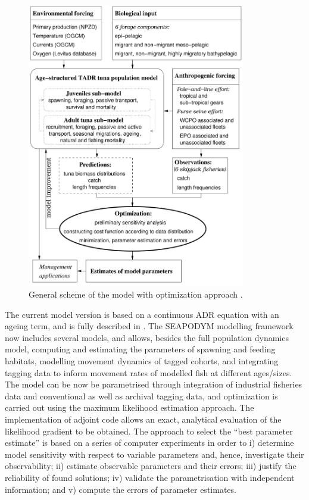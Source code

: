 \begin{figure}[htbp]
	\centering
	\includegraphics[width=0.85\textwidth]{intro/figs/fig-scheme-old}
	\caption{General scheme of the model with optimization approach \citep[from][]{Senina08}.} 
	\label{model_scheme}
\end{figure}

The current model version is based on a continuous ADR equation with an ageing term, and is fully described in \citet{Senina20a,Senina20b}. The SEAPODYM modelling framework now includes several models, and allows, besides the full population dynamics model, computing and estimating the parameters of spawning and feeding habitats, modelling movement dynamics of tagged cohorts, and integrating tagging data to inform movement rates of modelled fish at different ages/sizes. The model can be now be parametrised through integration of industrial fisheries data and conventional as well as archival tagging data, and optimization is carried out using the maximum likelihood estimation approach. The implementation of adjoint code allows an exact, analytical evaluation of the likelihood gradient to be obtained. The approach to select the ``best parameter estimate'' is based on a series of computer experiments in order to i) determine model sensitivity with respect to variable parameters and, hence, investigate their observability; ii) estimate observable parameters and their errors; iii) justify the reliability of found solutions; iv) validate the parametrisation with independent information; and v) compute the errors of parameter estimates. \\

